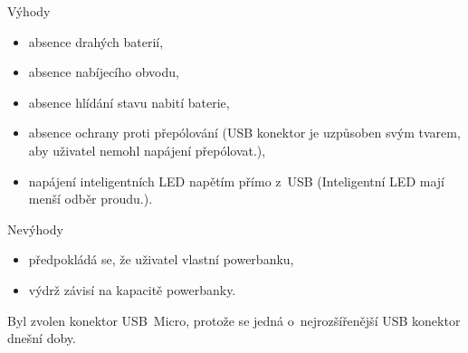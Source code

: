   Výhody
  \begin{itemize}
    \item absence drahých baterií,
    \item absence nabíjecího obvodu,
    \item absence hlídání stavu nabití baterie,
    \item absence ochrany proti přepólování (USB konektor je uzpůsoben svým tvarem, aby uživatel nemohl napájení přepólovat.),
    \item napájení inteligentních LED napětím přímo z~USB (Inteligentní LED mají menší odběr proudu.).
  \end{itemize}

  Nevýhody
  \begin{itemize}
    \item předpokládá se, že uživatel vlastní powerbanku,
    \item výdrž závisí na kapacitě powerbanky. 
  \end{itemize}

  Byl zvolen konektor USB~Micro, protože se jedná o~nejrozšířenější USB konektor dnešní doby.

 
  




